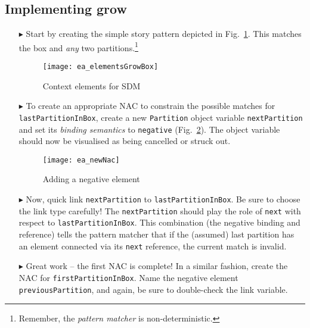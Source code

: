 \newpage
\hypertarget{growBox vis}{}
\subsection{Implementing grow}
\visHeader

\begin{itemize}
 
\item[$\blacktriangleright$] Start by creating the simple story pattern depicted in Fig.~\ref{ea:sdm_growContext}. This matches the box and \emph{any} two
partitions.\footnote{Remember, the \emph{pattern matcher} is non-deterministic.}

\vspace{0.5cm}

\begin{figure}[htbp]
\begin{center}
  \texttt{[image: ea\_elementsGrowBox]}
  \caption{Context elements for SDM}  
  \label{ea:sdm_growContext}
\end{center}
\end{figure}

\item[$\blacktriangleright$] To create an appropriate \mbox{NAC} to constrain the possible matches for \texttt{lastPartitionInBox},  create a new
\texttt{Partition} object variable \texttt{next\-Part\-ition} and set its \emph{binding semantics} to \texttt{negative} (Fig.~\ref{ea:sdm_negOV}). The object
variable should now be visualised as being cancelled or struck out.
 
\begin{figure}[htbp]
\begin{center}
  \texttt{[image: ea\_newNac]}
  \caption{Adding a negative element}  
  \label{ea:sdm_negOV}
\end{center}
\end{figure}
 
\item[$\blacktriangleright$] Now, quick link \texttt{nextPartition} to \texttt{lastPartitionInBox}. Be sure to choose the link type carefully! The
\texttt{nextPartition} should play the role of \texttt{next} with respect to \texttt{lastPartitionInBox}. This combination (the negative binding and reference)
tells the pattern matcher that if the (assumed) last partition has an element connected via its \texttt{next} reference, the current match is invalid.

\item[$\blacktriangleright$] Great work -- the first NAC is complete! In a similar fashion, create the NAC for \texttt{firstPartitionInBox}. Name the
negative element \texttt{previousPartition}, and again, be sure to double-check the link variable.


\end{itemize}
